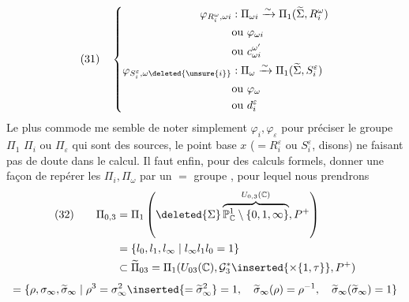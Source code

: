 \[
(31)\quad\left\{\begin{aligned}
\varphi_{R_i^\omega,\omega i}&:\Pi_{\omega i}\xrightarrow{\sim}\Pi_1(\widetilde\Sigma,R_i^\omega)\\
&\text{ou }\varphi_{\omega i}\\
&\text{ou }c_{\omega i}^{\omega'}\\
\varphi_{S_i^\varepsilon,\omega\deleted{\unsure{i}}}&:\Pi_\omega\xrightarrow{\sim}\Pi_1(\widetilde\Sigma,S_i^\varepsilon)\\
&\text{ou }\varphi_\omega\\
&\text{ou }d_i^{\varepsilon}
\end{aligned}\right.
\]
Le plus commode me semble de noter simplement $\varphi_i,\varphi_\varepsilon$ pour préciser le groupe $\Pi_1$  $\Pi_i$ ou $\Pi_\varepsilon$ qui sont des sources, le point base $x$ ($=R_i^\varepsilon$ ou $S_i^\varepsilon$, disons) ne faisant pas de doute dans le calcul.
Il faut enfin, pour des calculs formels, donner une façon de repérer les $\Pi_i,\Pi_\omega$ par un $=$ groupe  , pour lequel nous prendrons
\[
\begin{aligned}
(32)\qquad\Pi_{0,3}&=\Pi_1\left(\deleted{\Sigma}\overbrace{\mathbb P^1_{\mathbb C}\setminus\{0,1,\infty\}}^{U_{0,3}(\mathbb C)},P^+\right)\\
&=\{l_0,l_1,l_\infty\mid l_\infty l_1l_0=1\}\\
&\subset\widetilde\Pi_{03}=\Pi_1(U_{03}(\mathbb C),\mathcal G_3^*\inserted{\times\{1,\tau\}},P^+)
\end{aligned}
\]
\[
=\{\rho,\sigma_\infty,\widetilde\sigma_\infty\mid \rho^3=\sigma_\infty^2\inserted{=\widetilde\sigma_\infty^2}=1,\quad \widetilde\sigma_\infty(\rho)=\rho^{-1},\quad\widetilde\sigma_\infty(\widetilde\sigma_\infty)=1\}
\]

